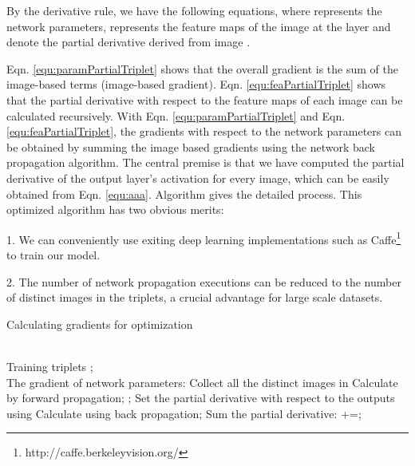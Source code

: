 \documentclass[letterpaper]{article}
\begin{document}
By the derivative rule, we have the following equations, where  represents the network parameters,  represents the feature maps of the image  at the  layer and  denote the partial derivative derived from image .
\begin{small}

\end{small}
\begin{small}

\end{small}
Eqn. \ref{equ:paramPartialTriplet} shows that the overall gradient is the sum of the image-based terms (image-based gradient). Eqn. \ref{equ:feaPartialTriplet} shows that the partial derivative with respect to the feature maps of each image can be calculated recursively. With Eqn. \ref{equ:paramPartialTriplet} and Eqn. \ref{equ:feaPartialTriplet}, the gradients with respect to the network parameters can be obtained by summing the image based gradients using the network back propagation algorithm. The central premise is that we have computed the partial derivative of the output layer's activation for every image, which can be easily obtained from Eqn. \ref{equ:aaa}. Algorithm  gives the detailed process. This optimized algorithm has two obvious merits:

1. We can conveniently use exiting deep learning implementations such as Caffe\footnote{http://caffe.berkeleyvision.org/} to train our model.

2. The number of network propagation executions can be reduced to the number of distinct images in the triplets, a crucial advantage for large scale datasets.
\renewcommand{\algorithmicrequire}{ \textbf{Input:}} \renewcommand{\algorithmicensure}{ \textbf{Output:}} \begin{small}
\vspace{-3mm}
\begin{algorithm}[htb]
\caption{Calculating gradients for optimization}
\label{alg:gradDescentByImage}
\begin{algorithmic}[1]
\REQUIRE ~~\\
   Training triplets ;
\ENSURE ~~\\
	The gradient of network parameters: 
\STATE Collect all the distinct images  in 
\FORALL {}
   \STATE Calculate  by forward propagation;
\ENDFOR
\FORALL {}
\STATE ;
	 \IF {}
        \IF {=}
            \STATE 
        \ELSIF {=}
           \STATE 
        \ELSIF {=}
           \STATE 
        \ENDIF
        \ENDIF
\ENDFOR
\STATE Set the partial derivative with respect to the outputs using 
\STATE Calculate  using back propagation;
\STATE Sum the partial derivative: +=;

\ENDFOR
\end{algorithmic}
\end{algorithm}
\vspace{-3mm}
\end{small}
\end{document}
